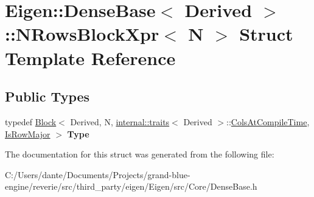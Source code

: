 \hypertarget{struct_eigen_1_1_dense_base_1_1_n_rows_block_xpr}{}\section{Eigen\+::Dense\+Base$<$ Derived $>$\+::N\+Rows\+Block\+Xpr$<$ N $>$ Struct Template Reference}
\label{struct_eigen_1_1_dense_base_1_1_n_rows_block_xpr}
\subsection*{Public Types}
\begin{DoxyCompactItemize}
\item 
\mbox{\label{struct_eigen_1_1_dense_base_1_1_n_rows_block_xpr_ae950c080aaac60c9937a1fedb93f2340}} 
typedef \mbox{\hyperlink{class_eigen_1_1_block}{Block}}$<$ Derived, N, \mbox{\hyperlink{struct_eigen_1_1internal_1_1traits}{internal\+::traits}}$<$ Derived $>$\+::\mbox{\hyperlink{class_eigen_1_1_dense_base_a86241c772c74c04eeeb0480b99c5ab77a787f85fd67ee5985917eb2cef6e70441}{Cols\+At\+Compile\+Time}}, \mbox{\hyperlink{class_eigen_1_1_dense_base_a86241c772c74c04eeeb0480b99c5ab77a406b6af91d61d348ba1c9764bdd66008}{Is\+Row\+Major}} $>$ {\bfseries Type}
\end{DoxyCompactItemize}


The documentation for this struct was generated from the following file\+:\begin{DoxyCompactItemize}
\item 
C\+:/\+Users/dante/\+Documents/\+Projects/grand-\/blue-\/engine/reverie/src/third\+\_\+party/eigen/\+Eigen/src/\+Core/Dense\+Base.\+h\end{DoxyCompactItemize}
